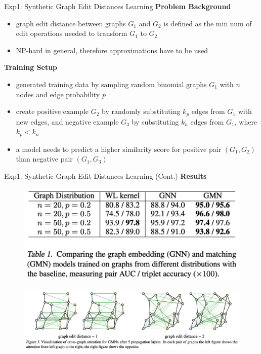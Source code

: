 \documentclass{beamer}
\begin{document}
\begin{frame}{Exp1: Synthetic Graph Edit Distances Learning}
\textbf{Problem Background}
\begin{itemize}
    \item graph edit distance between graphs $G_1$ and $G_2$ is defined as the min num of edit operations needed to transform $G_1$ to $G_2$
    \item NP-hard in general, therefore approximations have to be used
\end{itemize}
\textbf{Training Setup}
\begin{itemize}
    \item generated training data by sampling random binomial graphs $G_{1}$ with $n$ nodes and edge probability $p$
    \item create positive example $G_{2}$ by randomly substituting $k_{p}$ edges from $G_{1}$ with new edges, and negative example $G_{3}$ by substituting $k_{n}$ edges from $G_{1}$, where $k_{p}<k_{n}$
    \item a model needs to predict a higher similarity score for positive pair $\left(G_{1}, G_{2}\right)$ than negative pair $\left(G_{1}, G_{3}\right)$
\end{itemize}
\end{frame}


\begin{frame}{Exp1: Synthetic Graph Edit Distances Learning (Cont.)}
\textbf{Results}
\begin{figure}[h]
\centering
\includegraphics[height=0.3\textheight]{pic/GMN/gmn_table1.png}
\end{figure}
\begin{figure}[h]
\centering
\includegraphics[height=0.4\textheight]{pic/GMN/gmn_fig3.png}
\end{figure}
\end{frame}
\end{document}
